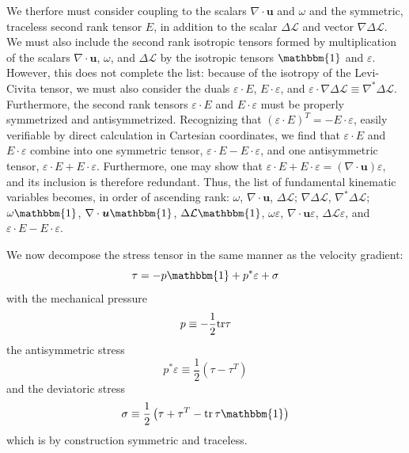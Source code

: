 \documentclass[%
 reprint,
superscriptaddress,
longbibliography,
 amsmath,amssymb,
 prl,
 citeautoscript,
]{revtex4-1}
\begin{document}
We therfore must consider coupling to the scalars $\nabla \cdot {\boldsymbol u}$ and $\omega$ and the symmetric, traceless second rank tensor $E$, in addition to the scalar $\Delta \mathcal{L}$ and vector $\nabla \Delta \mathcal{L}$. We must also include the second rank isotropic tensors formed by multiplication of the scalars $\nabla \cdot {\boldsymbol u}$, $\omega$, and $\Delta \mathcal{L}$ by the isotropic tensors $\mathbbm{1}$ and $\varepsilon$. However, this does not complete the list: because of the isotropy of the Levi-Civita tensor, we must also consider the duals $\varepsilon \cdot E$, $E \cdot \varepsilon$, and $\varepsilon \cdot \nabla \Delta \mathcal{L} \equiv \nabla^* \Delta \mathcal{L}$. Furthermore, the second rank tensors $\varepsilon \cdot E$ and $E \cdot \varepsilon$ must be properly symmetrized and antisymmetrized. Recognizing that $\left( \varepsilon \cdot E \right)^T = - E \cdot \varepsilon$, easily verifiable by direct calculation in Cartesian coordinates, we find that $\varepsilon \cdot E$ and $E \cdot \varepsilon$ combine into one symmetric tensor, $\varepsilon \cdot E - E \cdot \varepsilon$, and one antisymmetric tensor, $\varepsilon \cdot E + E \cdot \varepsilon$. Furthermore, one may show that $\varepsilon \cdot E + E \cdot \varepsilon = \left( \nabla \cdot {\boldsymbol u} \right) \varepsilon$, and its inclusion is therefore redundant. Thus, the list of fundamental kinematic variables becomes, in order of ascending rank: $\omega$, $\nabla \cdot {\boldsymbol u}$, $\Delta \mathcal{L}$; $\nabla \Delta \mathcal{L}$,  $\nabla^* \Delta \mathcal{L}$; $\omega \mathbbm{1}$, $\nabla \cdot {\boldsymbol u} \mathbbm{1}$, $\Delta \mathcal{L} \mathbbm{1}$, $\omega \varepsilon$, $\nabla \cdot {\boldsymbol u} \varepsilon$, $\Delta \mathcal{L} \varepsilon$, and $\varepsilon \cdot E - E \cdot \varepsilon$.

We now decompose the stress tensor in the same manner as the velocity gradient:
\begin{equation}
\tau = - p \mathbbm{1} + p^* \varepsilon + \sigma
\label{eqn:tau_decomp}
\end{equation}
with the mechanical pressure
\begin{equation}
p \equiv - \frac{1}{2} {\rm tr} \tau
\label{eqn:mechanical_pressure}
\end{equation}
the antisymmetric stress
\begin{equation}
p^* \varepsilon \equiv \frac{1}{2} \left( \tau - \tau^T \right)
\label{eqn:pstar_defn}
\end{equation}
and the deviatoric stress
\begin{equation}
\sigma \equiv \frac{1}{2} \left( \tau + \tau^T - {\rm tr} \, \tau \mathbbm{1} \right)
\label{eqn:deviatoric_stress}
\end{equation}
which is by construction symmetric and traceless.
\end{document}
